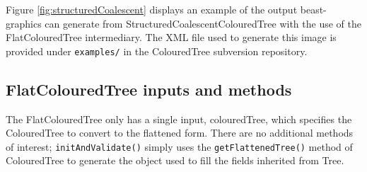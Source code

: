 \documentclass[a4paper,11pt]{paper}
\newcommand{\class}[1]{\textsf{#1}}
\newcommand{\project}[1]{\textsf{#1}}
\newcommand{\inp}[1]{\textsf{\color{blue}#1}}
\newcommand{\code}[1]{\texttt{#1}}
\begin{document}
Figure \ref{fig:structuredCoalescent} displays an example of the
output \project{beast-graphics} can generate from
\class{StructuredCoalescentColouredTree} with the use of the
\class{FlatColouredTree} intermediary. The XML file used to generate
this image is provided under \code{examples/} in the
\project{ColouredTree} subversion repository.

\subsection{FlatColouredTree inputs and methods}

The \class{FlatColouredTree} only has a single input,
\inp{colouredTree}, which specifies the \class{ColouredTree} to
convert to the flattened form. There are no additional methods of
interest; \code{initAndValidate()} simply uses the
\code{getFlattenedTree()} method of \class{ColouredTree} to generate
the object used to fill the fields inherited from \class{Tree}.
\end{document}
